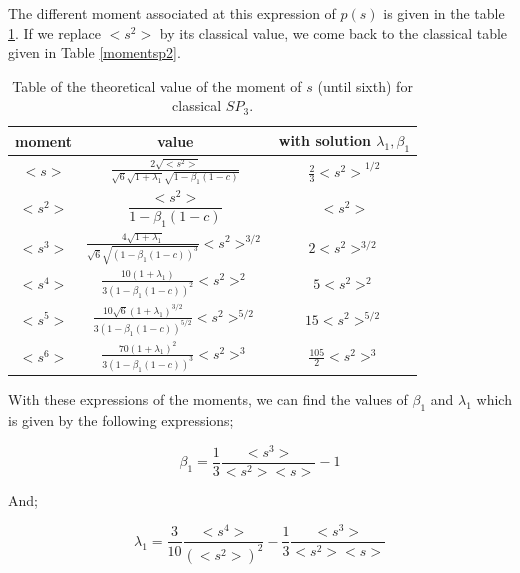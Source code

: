 \documentclass[a4paper, 12pt]{report}
\newcommand{\bl}{\big<}
\newcommand{\bg}{\big>}
\begin{document}
The different moment associated at this expression of $p(s)$ is given in the table \ref{momentnsp2}. If we replace $\bl s^2 \bg$ by its classical value, we come back to the classical table given in Table \ref{momentsp2}.

\begin{center}
\begin{table}
\begin{center}
\begin{tabular}{|c|c|c|}
\hline
moment & value & with solution $\lambda_1,\beta_1$ \\ \hline
$\bl s \bg$ &$ \frac{2\sqrt{\bl s^2 \bg}}{\sqrt{6}\sqrt{1+\lambda_1}\sqrt{1-\beta_1(1-c)}}$& $ \frac{2}{3}{\bl s^2 \bg}^{1/2}$ \\ \hline
$\bl s^2 \bg$ & $\dfrac{\bl s^2 \bg}{1-\beta_1(1-c)}$ &$\bl s^2 \bg$\\ \hline
$\bl s^3 \bg$ &$ \frac{4\sqrt{1+\lambda_1}}{\sqrt{6}\sqrt{(1-\beta_1(1-c))^3}}{\bl s^2 \bg^{3/2}}$&$ 2{\bl s^2 \bg^{3/2}}$ \\ \hline
$\bl s^4 \bg$ &$ \frac{10(1+\lambda_1)}{3(1-\beta_1(1-c))^2}\bl s^2 \bg^2$& $ 5\bl s^2 \bg^2$ \\ \hline
$\bl s^5 \bg$ &$ \frac{10\sqrt{6}(1+\lambda_1)^{3/2}}{3(1-\beta_1(1-c))^{5/2}}\bl s^2 \bg^{5/2}$& $ 15\bl s^2 \bg^{5/2}$ \\ \hline
$\bl s^6 \bg$ &$ \frac{70(1+\lambda_1)^{2}}{3(1-\beta_1(1-c))^{3}}\bl s^2 \bg^3$&$\frac{105}{2}\bl s^2 \bg^3$  \\ \hline
\end{tabular}
\caption{\label{momentnsp2} Table of the theoretical value of the moment of $s$ (until sixth) for classical $SP_3$. }
\end{center}
\end{table}
\end{center}

With these expressions of the moments, we can find the values of $\beta_1$ and $\lambda_1$ which is given by the following expressions;

\begin{equation}
\beta_1 = \frac{1}{3} \frac{\bl s^3 \bg}{\bl s^2 \bg\bl s \bg} - 1
\end{equation}

And;

\begin{equation}
\lambda_1 = \frac{3}{10} \frac{\bl s^4 \bg}{\left(\bl s^2 \bg \right)^2} - \frac{1}{3} \frac{\bl s^3 \bg}{\bl s^2 \bg\bl s \bg}
\end{equation}
\end{document}
